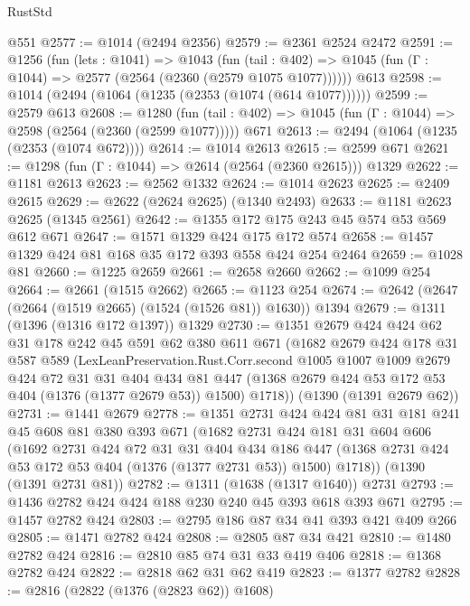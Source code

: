 \begin{lexlean}{RustStd}
\begin{coremodule}
    @551
@2577 := @1014 (@2494 @2356)
@2579 := @2361 @2524 @2472
@2591 := @1256
    (fun (lets : @1041) =>
    @1043
      (fun (tail : @402) => @1045 (fun (Γ : @1044) => @2577 (@2564 (@2360 (@2579 @1075 @1077))))))
    @613
@2598 := @1014 (@2494 (@1064 (@1235 (@2353 (@1074 (@614 @1077))))))
@2599 := @2579 @613
@2608 := @1280
    (fun (tail : @402) => @1045 (fun (Γ : @1044) => @2598 (@2564 (@2360 (@2599 @1077)))))
    @671
@2613 := @2494 (@1064 (@1235 (@2353 (@1074 @672))))
@2614 := @1014 @2613
@2615 := @2599 @671
@2621 := @1298 (fun (Γ : @1044) => @2614 (@2564 (@2360 @2615))) @1329
@2622 := @1181 @2613
@2623 := @2562 @1332
@2624 := @1014 @2623
@2625 := @2409 @2615
@2629 := @2622 (@2624 @2625) (@1340 @2493)
@2633 := @1181 @2623 @2625 (@1345 @2561)
@2642 := @1355 @172 @175 @243 @45 @574 @53 @569 @612 @671
@2647 := @1571 @1329 @424 @175 @172 @574
@2658 := @1457 @1329 @424 @81 @168 @35 @172 @393 @558 @424 @254 @2464
@2659 := @1028 @81
@2660 := @1225 @2659
@2661 := @2658 @2660
@2662 := @1099 @254
@2664 := @2661 (@1515 @2662)
@2665 := @1123 @254
@2674 := @2642 (@2647 (@2664 (@1519 @2665) (@1524 (@1526 @81)) @1630)) @1394
@2679 := @1311 (@1396 (@1316 @172 @1397)) @1329
@2730 := @1351
    @2679
    @424
    @424
    @62
    @31
    @178
    @242
    @45
    @591
    @62
    @380
    @611
    @671
    (@1682
      @2679
      @424
      @178
      @31
      @587
      @589
      (LexLeanPreservation.Rust.Corr.second
        @1005
        @1007
        @1009
        @2679
        @424
        @72
        @31
        @31
        @404
        @434
        @81
        @447
        (@1368 @2679 @424 @53 @172 @53 @404 (@1376 (@1377 @2679 @53)) @1500)
        @1718))
    (@1390 (@1391 @2679 @62))
@2731 := @1441 @2679
@2778 := @1351
    @2731
    @424
    @424
    @81
    @31
    @181
    @241
    @45
    @608
    @81
    @380
    @393
    @671
    (@1682
      @2731
      @424
      @181
      @31
      @604
      @606
      (@1692
        @2731
        @424
        @72
        @31
        @31
        @404
        @434
        @186
        @447
        (@1368 @2731 @424 @53 @172 @53 @404 (@1376 (@1377 @2731 @53)) @1500)
        @1718))
    (@1390 (@1391 @2731 @81))
@2782 := @1311 (@1638 (@1317 @1640)) @2731
@2793 := @1436 @2782 @424 @424 @188 @230 @240 @45 @393 @618 @393 @671
@2795 := @1457 @2782 @424
@2803 := @2795 @186 @87 @34 @41 @393 @421 @409 @266
@2805 := @1471 @2782 @424
@2808 := @2805 @87 @34 @421
@2810 := @1480 @2782 @424
@2816 := @2810 @85 @74 @31 @33 @419 @406
@2818 := @1368 @2782 @424
@2822 := @2818 @62 @31 @62 @419
@2823 := @1377 @2782
@2828 := @2816 (@2822 (@1376 (@2823 @62)) @1608)

\end{coremodule}
\end{lexlean}
